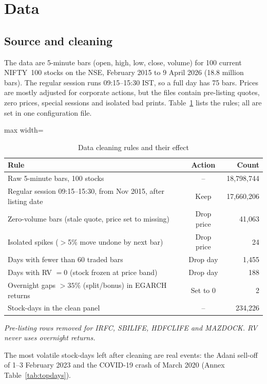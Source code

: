 \documentclass[11pt,a4paper]{article}
\let\oldsection\section
\renewcommand{\section}{\FloatBarrier\needspace{6\baselineskip}\oldsection}
\begin{document}
\section{Data}

\subsection{Source and cleaning}

The data are 5-minute bars (open, high, low, close, volume) for 100 current NIFTY~100 stocks on the
NSE, February 2015 to 9 April 2026 (18.8 million bars). The regular session runs 09:15--15:30 IST, so
a full day has 75 bars. Prices are mostly adjusted for corporate actions, but the files contain
pre-listing quotes, zero prices, special sessions and isolated bad prints. Table~\ref{tab:cleaning}
lists the rules; all are set in one configuration file.

\begin{table}[htbp]
\centering
\caption{Data cleaning rules and their effect}
\label{tab:cleaning}
\small
\begin{adjustbox}{max width=\textwidth}
\begin{tabular}{lcr}
\toprule
Rule & Action & Count \\
\midrule
Raw 5-minute bars, 100 stocks & -- & 18,798,744 \\
Regular session 09:15--15:30, from Nov 2015, after listing date & Keep & 17,660,206 \\
Zero-volume bars (stale quote, price set to missing) & Drop price & 41,063 \\
Isolated spikes ($>$5\% move undone by next bar) & Drop price & 24 \\
Days with fewer than 60 traded bars & Drop day & 1,455 \\
Days with RV $=0$ (stock frozen at price band) & Drop day & 188 \\
Overnight gaps $>35\%$ (split/bonus) in EGARCH returns & Set to 0 & 2 \\
Stock-days in the clean panel & -- & 234,226 \\
\bottomrule
\end{tabular}
\end{adjustbox}
\par\smallskip\parbox{0.95\textwidth}{\footnotesize\itshape Pre-listing rows removed for IRFC, SBILIFE, HDFCLIFE and MAZDOCK. RV never uses overnight returns.}
\end{table}


The most volatile stock-days left after cleaning are real events: the Adani sell-off of 1--3 February
2023 and the COVID-19 crash of March 2020 (Annex Table~\ref{tab:topdays}).
\end{document}
